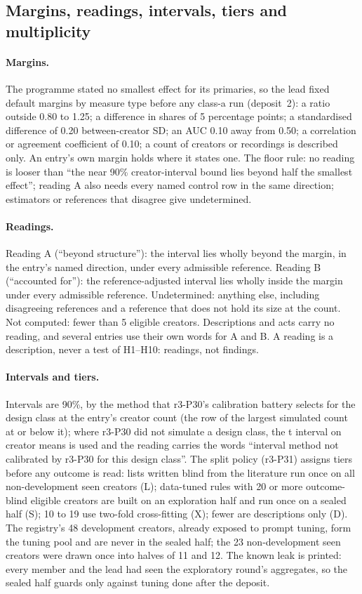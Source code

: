 \subsection{Margins, readings, intervals, tiers and multiplicity}
\label{app:panel3-readings}

\paragraph{Margins.} The programme stated no smallest effect for its primaries, so the lead fixed default margins by
measure type before any class-a run (deposit~2): a ratio outside 0.80 to 1.25; a difference in shares of 5 percentage
points; a standardised difference of 0.20 between-creator SD; an AUC 0.10 away from 0.50; a correlation or agreement
coefficient of 0.10; a count of creators or recordings is described only. An entry's own margin holds where it states
one. The floor rule: no reading is looser than ``the near 90\% creator-interval bound lies beyond half the smallest
effect''; reading A also needs every named control row in the same direction; estimators or references that disagree
give undetermined.

\paragraph{Readings.} Reading A (``beyond structure''): the interval lies wholly beyond the margin, in the entry's named
direction, under every admissible reference. Reading B (``accounted for''): the reference-adjusted interval lies wholly
inside the margin under every admissible reference. Undetermined: anything else, including disagreeing references and
a reference that does not hold its size at the count. Not computed: fewer than 5 eligible creators. Descriptions and
acts carry no reading, and several entries use their own words for A and B. A reading is a description, never a test of
H1--H10: readings, not findings.

\paragraph{Intervals and tiers.} Intervals are 90\%, by the method that r3-P30's calibration battery selects for the
design class at the entry's creator count (the row of the largest simulated count at or below it); where r3-P30 did not
simulate a design class, the t interval on creator means is used and the reading carries the words ``interval method
not calibrated by r3-P30 for this design class''. The split policy (r3-P31) assigns tiers before any outcome is read:
lists written blind from the literature run once on all non-development seen creators (L); data-tuned rules with 20 or
more outcome-blind eligible creators are built on an exploration half and run once on a sealed half (S); 10 to 19 use
two-fold cross-fitting (X); fewer are descriptions only (D). The registry's 48 development creators, already exposed to
prompt tuning, form the tuning pool and are never in the sealed half; the 23 non-development seen creators were drawn
once into halves of 11 and 12. The known leak is printed: every member and the lead had seen the exploratory round's
aggregates, so the sealed half guards only against tuning done after the deposit.

